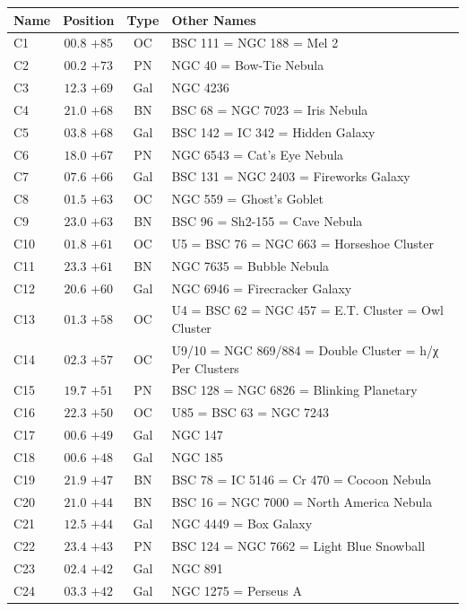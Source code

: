 
\begin{table}[t]
    \setlength{\tabcolsep}{2pt}
    \footnotesize
    \begin{tabularx}{\linewidth}{lccX}
        \hline
        Name&Position&Type&Other Names\\
        \hline

C1   &$00.8$ $+85$&OC &BSC 111 = NGC 188 = Mel 2\\
C2   &$00.2$ $+73$&PN &NGC 40 = Bow-Tie Nebula\\
C3   &$12.3$ $+69$&Gal&NGC 4236\\
C4   &$21.0$ $+68$&BN &BSC 68 = NGC 7023 = Iris Nebula\\
C5   &$03.8$ $+68$&Gal&BSC 142 = IC 342 = Hidden Galaxy\\
C6   &$18.0$ $+67$&PN &NGC 6543 = Cat's Eye Nebula\\
C7   &$07.6$ $+66$&Gal&BSC 131 = NGC 2403 = Fireworks Galaxy\\
C8   &$01.5$ $+63$&OC &NGC 559 = Ghost's Goblet\\
C9   &$23.0$ $+63$&BN &BSC 96 = Sh2-155 = Cave Nebula\\
C10  &$01.8$ $+61$&OC &U5 = BSC 76 = NGC 663 = Horseshoe Cluster\\
C11  &$23.3$ $+61$&BN &NGC 7635 = Bubble Nebula\\
C12  &$20.6$ $+60$&Gal&NGC 6946 = Firecracker Galaxy\\
C13  &$01.3$ $+58$&OC &U4 = BSC 62 = NGC 457 = E.T. Cluster = Owl Cluster\\
C14  &$02.3$ $+57$&OC &U9/10 = NGC 869/884 = Double Cluster = h/χ Per Clusters\\
C15  &$19.7$ $+51$&PN &BSC 128 = NGC 6826 = Blinking Planetary\\
C16  &$22.3$ $+50$&OC &U85 = BSC 63 = NGC 7243\\
C17  &$00.6$ $+49$&Gal&NGC 147\\
C18  &$00.6$ $+48$&Gal&NGC 185\\
C19  &$21.9$ $+47$&BN &BSC 78 = IC 5146 = Cr 470 = Cocoon Nebula\\
C20  &$21.0$ $+44$&BN &BSC 16 = NGC 7000 = North America Nebula\\
C21  &$12.5$ $+44$&Gal&NGC 4449 = Box Galaxy\\
C22  &$23.4$ $+43$&PN &BSC 124 = NGC 7662 = Light Blue Snowball\\
C23  &$02.4$ $+42$&Gal&NGC 891\\
C24  &$03.3$ $+42$&Gal&NGC 1275 = Perseus A\\

\end{tabularx}
\end{table}
